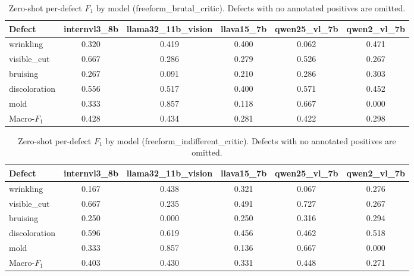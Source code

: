 \begin{table}[!htbp]
\centering
\caption{Zero-shot per-defect $F_1$ by model (freeform\_brutal\_critic). Defects with no annotated positives are omitted.}
\label{tab:defects_f1_freeform_brutal_critic}
\begin{tabular}{@{}lccccc@{}}
\toprule
\textbf{Defect} & \textbf{internvl3\_8b} & \textbf{llama32\_11b\_vision} & \textbf{llava15\_7b} & \textbf{qwen25\_vl\_7b} & \textbf{qwen2\_vl\_7b} \\
\midrule
wrinkling & 0.320 & 0.419 & 0.400 & 0.062 & 0.471 \\
visible\_cut & 0.667 & 0.286 & 0.279 & 0.526 & 0.267 \\
bruising & 0.267 & 0.091 & 0.210 & 0.286 & 0.303 \\
discoloration & 0.556 & 0.517 & 0.400 & 0.571 & 0.452 \\
mold & 0.333 & 0.857 & 0.118 & 0.667 & 0.000 \\
\midrule
Macro-$F_1$ & 0.428 & 0.434 & 0.281 & 0.422 & 0.298 \\
\bottomrule
\end{tabular}
\end{table}

\begin{table}[!htbp]
\centering
\caption{Zero-shot per-defect $F_1$ by model (freeform\_indifferent\_critic). Defects with no annotated positives are omitted.}
\label{tab:defects_f1_freeform_indifferent_critic}
\begin{tabular}{@{}lccccc@{}}
\toprule
\textbf{Defect} & \textbf{internvl3\_8b} & \textbf{llama32\_11b\_vision} & \textbf{llava15\_7b} & \textbf{qwen25\_vl\_7b} & \textbf{qwen2\_vl\_7b} \\
\midrule
wrinkling & 0.167 & 0.438 & 0.321 & 0.067 & 0.276 \\
visible\_cut & 0.667 & 0.235 & 0.491 & 0.727 & 0.267 \\
bruising & 0.250 & 0.000 & 0.250 & 0.316 & 0.294 \\
discoloration & 0.596 & 0.619 & 0.456 & 0.462 & 0.518 \\
mold & 0.333 & 0.857 & 0.136 & 0.667 & 0.000 \\
\midrule
Macro-$F_1$ & 0.403 & 0.430 & 0.331 & 0.448 & 0.271 \\
\bottomrule
\end{tabular}
\end{table}

